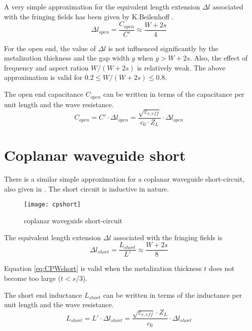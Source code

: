 A very simple approximation for the equivalent length extension
$\Delta l$ associated with the fringing fields has been given by
K.Beilenhoff \cite{Beilenhoff}.
\begin{equation}
\Delta l_{open} = \dfrac{C_{open}}{C'} \approx \dfrac{W + 2s}{4}
\end{equation}

For the open end, the value of $\Delta l$ is not influenced
significantly by the metalization thickness and the gap width $g$
when $g > W + 2s$.  Also, the effect of frequency and aspect ration $W
/ (W + 2s)$ is relatively weak.  The above approximation is valid for
$0.2 \le W / (W + 2s) \le 0.8$.

\addvspace{12pt}

The open end capacitance $C_{open}$ can be written in terms of the
capacitance per unit length and the wave resistance.
\begin{equation}
C_{open} = C'\cdot \Delta l_{open} = \dfrac{\sqrt{\varepsilon_{r,eff}}}{c_0\cdot Z_L} \cdot \Delta l_{open}
\end{equation}

\section{Coplanar waveguide short}

There is a similar simple approximation for a coplanar waveguide
short-circuit, also given in \cite{Beilenhoff}.  The short circuit is
inductive in nature.

\begin{figure}[ht]
\begin{center}
\texttt{[image: cpshort]}
\end{center}
\caption{coplanar waveguide short-circuit}
\label{fig:CPWshort}
\end{figure}
\FloatBarrier

The equivalent length extension $\Delta l$ associated with the
fringing fields is
\begin{equation}
\label{eq:CPWshort}
\Delta l_{short} = \dfrac{L_{short}}{L'} \approx \dfrac{W + 2s}{8}
\end{equation}

Equation \eqref{eq:CPWshort} is valid when the metalization thickness
$t$ does not become too large ($t < s/3$).

\addvspace{12pt}

The short end inductance $L_{short}$ can be written in terms of the
inductance per unit length and the wave resistance.
\begin{equation}
L_{short} = L'\cdot \Delta l_{short} = \dfrac{\sqrt{\varepsilon_{r,eff}}\cdot Z_L}{c_0} \cdot \Delta l_{short}
\end{equation}

